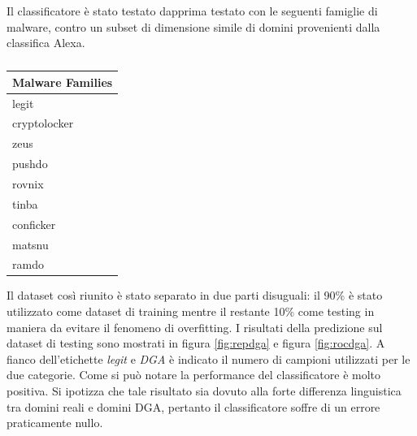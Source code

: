 Il classificatore è stato testato dapprima testato con le seguenti famiglie di malware, contro un subset di dimensione simile di domini provenienti dalla classifica Alexa.

\begin{table}[!bp]
    \centering
    \begin{tabular}[t]{l}
    \toprule
    Malware Families \\
    \midrule
	legit \\
	cryptolocker \\
	zeus \\
	pushdo \\
	rovnix \\
	tinba \\
	conficker \\
	matsnu \\
	ramdo \\
	\bottomrule
\end{tabular}
\caption{\label{tab:malware}}
\end{table}

Il dataset così riunito è stato separato in due parti disuguali: il 90\% è stato utilizzato come dataset di training mentre il restante 10\% come testing in maniera da evitare il fenomeno di overfitting. I risultati della predizione sul dataset di testing sono mostrati in figura \ref{fig:repdga} e figura \ref{fig:rocdga}. A fianco dell'etichette \textit{legit} e \textit{DGA} è indicato il numero di campioni utilizzati per le due categorie. Come si può notare la performance del classificatore è molto positiva. Si ipotizza che tale risultato sia dovuto alla forte differenza linguistica tra domini reali e domini DGA, pertanto il classificatore soffre di un errore praticamente nullo. 

